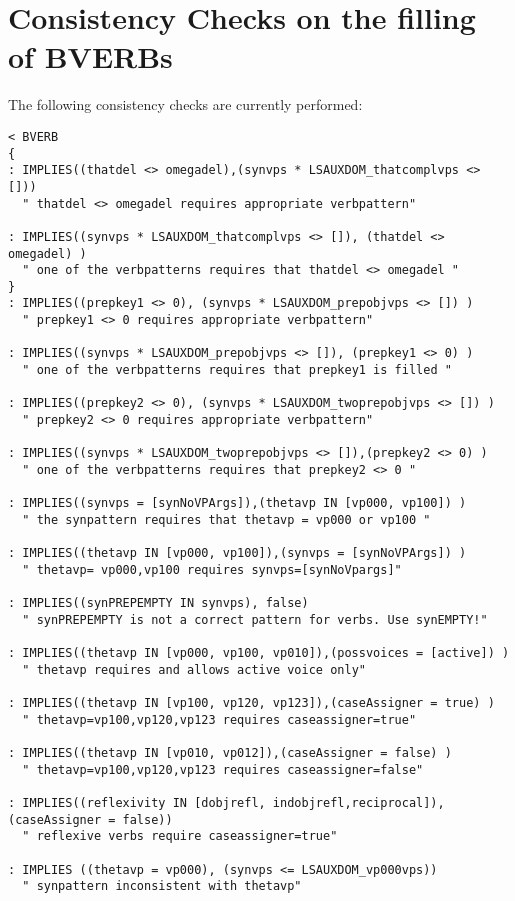 \newpage
\section{Consistency Checks on the filling of BVERBs}

The following consistency checks are currently performed:

\begin{verbatim}
< BVERB
{
: IMPLIES((thatdel <> omegadel),(synvps * LSAUXDOM_thatcomplvps <> []))
  " thatdel <> omegadel requires appropriate verbpattern"

: IMPLIES((synvps * LSAUXDOM_thatcomplvps <> []), (thatdel <> omegadel) )
  " one of the verbpatterns requires that thatdel <> omegadel "
}
: IMPLIES((prepkey1 <> 0), (synvps * LSAUXDOM_prepobjvps <> []) )
  " prepkey1 <> 0 requires appropriate verbpattern"

: IMPLIES((synvps * LSAUXDOM_prepobjvps <> []), (prepkey1 <> 0) )
  " one of the verbpatterns requires that prepkey1 is filled "

: IMPLIES((prepkey2 <> 0), (synvps * LSAUXDOM_twoprepobjvps <> []) )
  " prepkey2 <> 0 requires appropriate verbpattern"

: IMPLIES((synvps * LSAUXDOM_twoprepobjvps <> []),(prepkey2 <> 0) )
  " one of the verbpatterns requires that prepkey2 <> 0 "

: IMPLIES((synvps = [synNoVPArgs]),(thetavp IN [vp000, vp100]) )
  " the synpattern requires that thetavp = vp000 or vp100 "

: IMPLIES((thetavp IN [vp000, vp100]),(synvps = [synNoVPArgs]) )
  " thetavp= vp000,vp100 requires synvps=[synNoVpargs]"

: IMPLIES((synPREPEMPTY IN synvps), false)
  " synPREPEMPTY is not a correct pattern for verbs. Use synEMPTY!"

: IMPLIES((thetavp IN [vp000, vp100, vp010]),(possvoices = [active]) )
  " thetavp requires and allows active voice only"

: IMPLIES((thetavp IN [vp100, vp120, vp123]),(caseAssigner = true) )
  " thetavp=vp100,vp120,vp123 requires caseassigner=true"

: IMPLIES((thetavp IN [vp010, vp012]),(caseAssigner = false) )
  " thetavp=vp100,vp120,vp123 requires caseassigner=false"

: IMPLIES((reflexivity IN [dobjrefl, indobjrefl,reciprocal]),(caseAssigner = false))
  " reflexive verbs require caseassigner=true"

: IMPLIES ((thetavp = vp000), (synvps <= LSAUXDOM_vp000vps))
  " synpattern inconsistent with thetavp" 


\end{verbatim}
